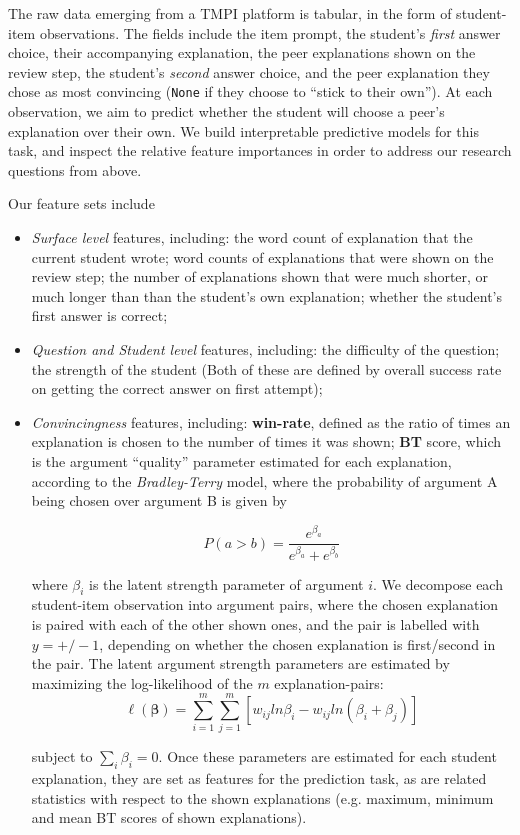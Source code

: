 \documentclass[sigconf]{acmart}
\begin{document}
The raw data emerging from a TMPI platform is tabular, in the form of 
student-item observations.
The fields include the item prompt, the student's \textit{first} answer choice, 
their accompanying explanation, the peer explanations shown on the review step, 
the student's \textit{second} answer choice, and the peer explanation they 
chose as most convincing (\verb|None| if they choose to ``stick to their own'').
At each observation, we aim to predict whether the student will choose a peer's 
explanation over their own.
We build interpretable predictive models for this task, and inspect the 
relative feature importances in order to address our research questions from 
above.

Our feature sets include
\begin{itemize}
	\item \textit{Surface level} features, including: 
	the word count of explanation that the current student wrote; 
	word counts of explanations that were shown on the review step; 
	the number of explanations shown that were much shorter, or much longer 
	than than the student's own explanation; 
	whether the student's first answer is correct;

	\item \textit{Question and Student level} features, including: 
	the difficulty of the question; 
	the strength of the student
	(Both of these are defined by overall success rate on getting the correct 
	answer on first attempt);
	
	\item \textit{Convincingness} features, including: 
	\textbf{win-rate}, defined as the ratio of times an explanation is chosen 
	to the number of times it was shown; 
	\textbf{BT} score, which is the argument ``quality'' parameter 
	estimated for each explanation, according to the \textit{Bradley-Terry} 
	model, where the probability of argument A being chosen over argument B is 
	given by 

$$
P(a>b) = 
\frac{e^{\beta_a}}{e^{\beta_a}+e^{\beta_b}}
$$

where $\beta_i$ is the latent strength parameter of argument $i$. 
We decompose each student-item observation into argument pairs, where the 
chosen explanation is paired with each of the other shown ones, and the pair is 
labelled with $y=+/-1$, depending on whether the chosen explanation is 
first/second in the pair.   
The latent argument strength parameters are estimated by maximizing the 
log-likelihood of the $m$ explanation-pairs:
$$
\ell(\boldsymbol{\beta})=\sum_{i=1}^{m}\sum_{j=1}^{m} 
[w_{ij}ln\beta_i-w_{ij}ln(\beta_i+\beta_j)]
$$

subject to $\sum_{i}\beta_i=0$.
Once these parameters are estimated for each student explanation, they are set 
as features for the prediction task, as are related statistics with respect to 
the shown explanations (e.g. maximum, minimum and mean BT scores of shown 
explanations).
\end{itemize}
\end{document}
